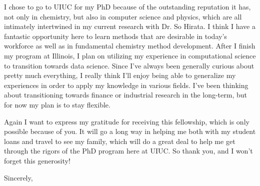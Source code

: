 \documentclass[11pt,a4paper]{letter} %
\begin{document}
\begin{letter}
I chose to go to UIUC for my PhD because of the outstanding reputation it has, not only in chemistry, but also in computer science and physics, which are all intimately intertwined in my current research with Dr. So Hirata. I think I have a fantastic opportunity here to learn methods that are desirable in today's workforce as well as in fundamental chemistry method development. After I finish my program at Illinois, I plan on utilizing my experience in computational science to transition towards data science. Since I've always been generally curious about pretty much everything, I really think I'll enjoy being able to generalize my experiences in order to apply my knowledge in various fields. I've been thinking about transitioning towards finance or industrial research in the long-term, but for now my plan is to stay flexible.  

Again I want to express my gratitude for receiving this fellowship, which is only possible because of you. It will go a long way in helping me both with my student loans and travel to see my family, which will do a great deal to help me get through the rigors of the PhD program here at UIUC. So thank you, and I won't forget this generosity!

\closing{Sincerely,}
\end{letter}
\end{document}
